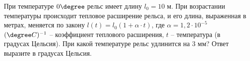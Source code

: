 \begin{ex}
	\begin{condition}
		При температуре \( 0\degree  \) рельс имеет длину \(  l_0=10\) м. При возрастании температуры происходит тепловое расширение рельса, и его длина, выраженная в метрах, меняется по закону \( l(t)=l_0(1+\alpha\cdot t) \), где \( \alpha = 1,2\cdot10^{-5} \) \( (\degree C)^{-1} \) – коэффициент теплового расширения, \( t \) – температура (в градусах Цельсия). При какой температуре рельс удлинится на \( 3 \) мм? Ответ выразите в градусах Цельсия.
	\end{condition}
\end{ex}